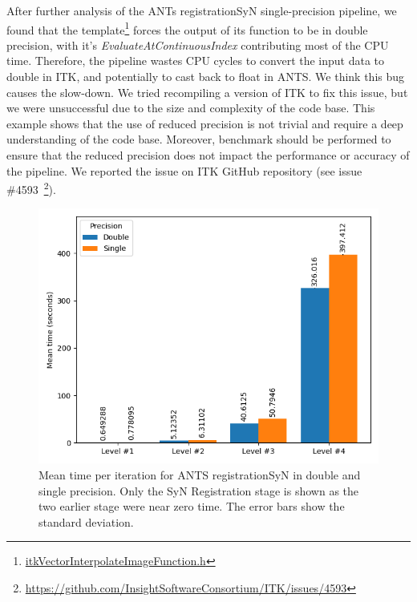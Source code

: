 \documentclass[conference]{IEEEtran}
\begin{document}
After further analysis of the ANTs registrationSyN single-precision pipeline, we found that the template\footnote{\href{https://github.com/InsightSoftwareConsortium/ITK/blob/d9c585d96359bf304ad3047148cee81bf27ac0c1/Modules/Core/ImageFunction/include/itkVectorInterpolateImageFunction.h\#L46-L48}{itkVectorInterpolateImageFunction.h}} forces the output of its function to be in double precision, with it's \textit{EvaluateAtContinuousIndex} contributing most of the CPU time. Therefore, the pipeline wastes CPU cycles to convert the input data to double in ITK, and potentially to cast back to float in ANTS. We think this bug causes the slow-down. We tried recompiling a version of ITK to fix this issue, but we were unsuccessful due to the size and complexity of the code base. This example shows that the use of reduced precision is not trivial and require a deep understanding of the code base. Moreover, benchmark should be performed to ensure that the reduced precision does not impact the performance or accuracy of the pipeline. We reported the issue on ITK GitHub repository (see issue \#4593~\footnote{\href{https://github.com/InsightSoftwareConsortium/ITK/issues/4593}{https://github.com/InsightSoftwareConsortium/ITK/issues/4593}}).

\begin{figure}
	\includegraphics[width=\linewidth]{figures/ants-registrationSyN-iteration-mean.png}
	\caption{Mean time per iteration for ANTS registrationSyN in double and single precision. Only the SyN Registration stage is shown as the two earlier stage were near zero time. The error bars show the standard deviation.}
	\label{fig:mean-time-per-iteration-ants}
\end{figure}
						
\end{document}
